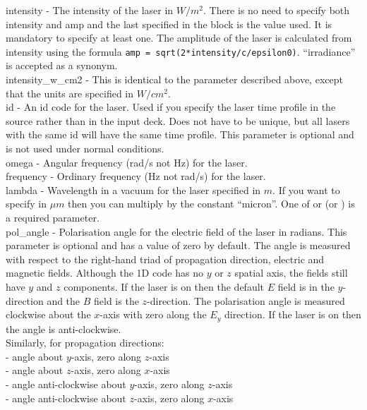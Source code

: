 {\emphtext intensity} - The intensity of the laser in $W/m^2$.
  There is no need to specify both intensity and amp and the last specified
  in the block is the value used. It is mandatory to specify at least one.
  The amplitude of the laser is calculated from intensity using the formula
  \verb|amp = sqrt(2*intensity/c/epsilon0)|.
  ``irradiance'' is accepted as a synonym.\\

{\emphtext intensity\_w\_cm2} - This is identical to the
   parameter described above, except that the units
  are specified in $W/cm^2$.\\

{\emphtext id} - An id code for the laser. Used if you specify the laser time
  profile in the {\EPOCH} source rather than in the input deck. Does not have to
  be unique, but all lasers with the same id will have the same time profile.
  This parameter is optional and is not used under normal conditions.\\

{\emphtext omega} - Angular frequency (rad/s not Hz) for the laser.\\

{\emphtext frequency} - Ordinary frequency (Hz not rad/s) for the laser.\\

{\emphtext lambda} - Wavelength in a vacuum for the laser specified in $m$.
  If you want to specify in $\mu m$ then you can multiply by the constant
  ``micron''. One of  or  (or
  ) is a required parameter.\\

{\emphtext pol\_angle} - Polarisation angle for the electric field of the
  laser in radians. This parameter is optional and has a value of zero by
  default. The angle is measured with respect to the right-hand triad of
  propagation direction, electric and magnetic fields. Although the 1D code
  has no $y$ or $z$ spatial axis, the fields still have $y$ and $z$ components.
  If the laser is on  then the default $E$ field is in the
  $y$-direction and the $B$ field is the $z$-direction. The polarisation angle
  is measured clockwise about the $x$-axis with zero along the $E_y$
  direction. If the laser is on  then the angle is
  anti-clockwise.\\
  Similarly, for propagation directions:\\
 - angle about $y$-axis, zero along $z$-axis\\
 - angle about $z$-axis, zero along $x$-axis\\
 - angle anti-clockwise about $y$-axis, zero along $z$-axis\\
 - angle anti-clockwise about $z$-axis, zero along $x$-axis\\

